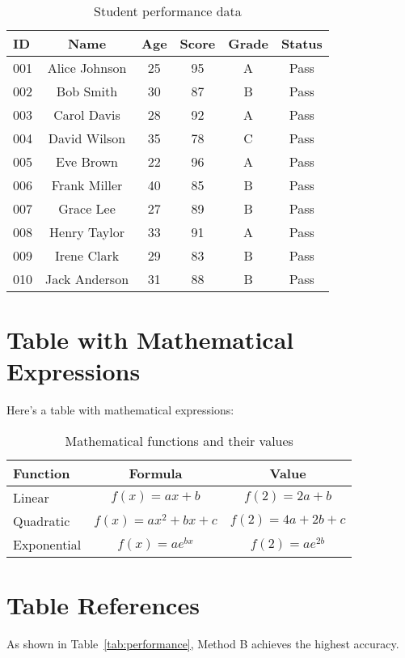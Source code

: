 \documentclass{article}
\begin{document}
\begin{table}[h]
\centering
\begin{tabular}{|l|c|c|c|c|c|}
\hline
\textbf{ID} & \textbf{Name} & \textbf{Age} & \textbf{Score} & \textbf{Grade} & \textbf{Status} \\
\hline
001 & Alice Johnson & 25 & 95 & A & Pass \\
002 & Bob Smith & 30 & 87 & B & Pass \\
003 & Carol Davis & 28 & 92 & A & Pass \\
004 & David Wilson & 35 & 78 & C & Pass \\
005 & Eve Brown & 22 & 96 & A & Pass \\
006 & Frank Miller & 40 & 85 & B & Pass \\
007 & Grace Lee & 27 & 89 & B & Pass \\
008 & Henry Taylor & 33 & 91 & A & Pass \\
009 & Irene Clark & 29 & 83 & B & Pass \\
010 & Jack Anderson & 31 & 88 & B & Pass \\
\hline
\end{tabular}
\caption{Student performance data}
\label{tab:long}
\end{table}

\section{Table with Mathematical Expressions}
Here's a table with mathematical expressions:

\begin{table}[h]
\centering
\begin{tabular}{|l|c|c|}
\hline
\textbf{Function} & \textbf{Formula} & \textbf{Value} \\
\hline
Linear & $f(x) = ax + b$ & $f(2) = 2a + b$ \\
Quadratic & $f(x) = ax^2 + bx + c$ & $f(2) = 4a + 2b + c$ \\
Exponential & $f(x) = ae^{bx}$ & $f(2) = ae^{2b}$ \\
\hline
\end{tabular}
\caption{Mathematical functions and their values}
\label{tab:math}
\end{table}

\section{Table References}
As shown in Table~\ref{tab:performance}, Method B achieves the highest accuracy.
\end{document}
